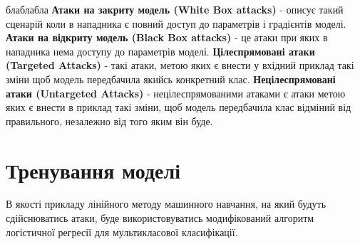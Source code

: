 \documentclass[a4paper,14pt]{extreport}
\begin{document}
	блаблабла \newline
	\textbf{Атаки на закриту модель (White Box attacks)} - описує такий сценарій коли в нападника  
	є повний доступ до параметрів і градієнтів моделі.  
	\newline
	\newline
	\textbf{Атаки на відкриту модель (Black Box attacks)} - це атаки при яких в нападника нема доступу до параметрів моделі. 
	\newline
	\newline
	\textbf{Цілеспрямовані атаки (Targeted Attacks)} - такі атаки, метою яких є внести у вхідний приклад такі зміни щоб модель передбачила якийсь конкретний клас.
	\newline
	\newline	
	\textbf{Нецілеспрямовані атаки (Untargeted Attacks)} - нецілеспрямованими атаками є атаки метою яких є внести в приклад такі зміни, щоб модель передбачила клас відміний від правильного, незалежно від того яким він буде.
	\newline
	\newline
	


	
	
	\chapter{Тренування моделі}
	В якості прикладу лінійного методу машинного навчання, на який будуть сдійснюватись атаки, буде використовуватись модифікований алгоритм логістичної регресії для мультикласової класифікації.
	
\end{document}
